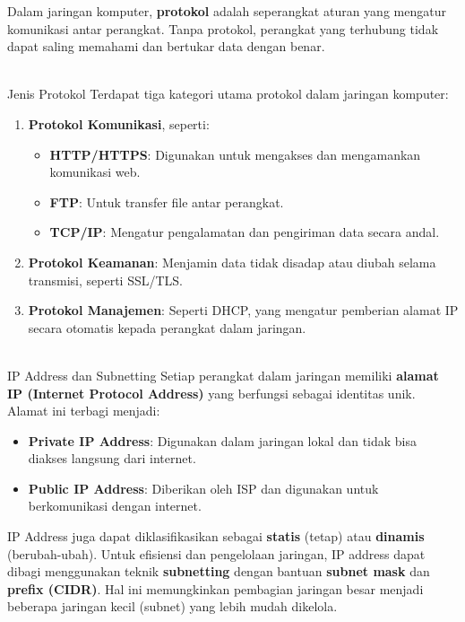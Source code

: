Dalam jaringan komputer, \textbf{protokol} adalah seperangkat aturan yang mengatur komunikasi antar perangkat. Tanpa protokol, perangkat yang terhubung tidak dapat saling memahami dan bertukar data dengan benar.

\\{Jenis Protokol}
Terdapat tiga kategori utama protokol dalam jaringan komputer:
\begin{enumerate}
    \item \textbf{Protokol Komunikasi}, seperti:
    \begin{itemize}
        \item \textbf{HTTP/HTTPS}: Digunakan untuk mengakses dan mengamankan komunikasi web.
        \item \textbf{FTP}: Untuk transfer file antar perangkat.
        \item \textbf{TCP/IP}: Mengatur pengalamatan dan pengiriman data secara andal.
    \end{itemize}
    \item \textbf{Protokol Keamanan}: Menjamin data tidak disadap atau diubah selama transmisi, seperti SSL/TLS.
    \item \textbf{Protokol Manajemen}: Seperti DHCP, yang mengatur pemberian alamat IP secara otomatis kepada perangkat dalam jaringan.
\end{enumerate}

\\{IP Address dan Subnetting}
Setiap perangkat dalam jaringan memiliki \textbf{alamat IP (Internet Protocol Address)} yang berfungsi sebagai identitas unik. Alamat ini terbagi menjadi:
\begin{itemize}
    \item \textbf{Private IP Address}: Digunakan dalam jaringan lokal dan tidak bisa diakses langsung dari internet.
    \item \textbf{Public IP Address}: Diberikan oleh ISP dan digunakan untuk berkomunikasi dengan internet.
\end{itemize}

IP Address juga dapat diklasifikasikan sebagai \textbf{statis} (tetap) atau \textbf{dinamis} (berubah-ubah). Untuk efisiensi dan pengelolaan jaringan, IP address dapat dibagi menggunakan teknik \textbf{subnetting} dengan bantuan \textbf{subnet mask} dan \textbf{prefix (CIDR)}. Hal ini memungkinkan pembagian jaringan besar menjadi beberapa jaringan kecil (subnet) yang lebih mudah dikelola.


